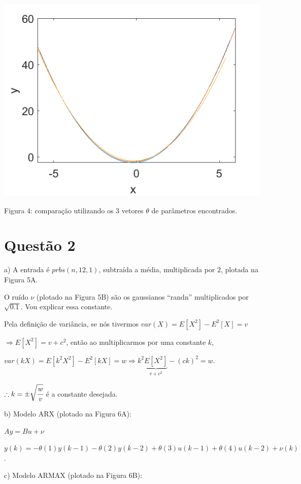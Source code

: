 \documentclass{rbfin}
\begin{document}
\begin{center}
\includegraphics[scale=0.666]{4 regredidos}

Figura 4: comparação utilizando os 3 vetores $\theta$ de parâmetros encontrados.
\end{center}

\section*{Questão 2}

a) A entrada é $prbs(n,12,1)$, subtraída a média, multiplicada por $2$, plotada na Figura 5A.

O ruído $\nu$ (plotado na Figura 5B) são os gaussianos ``randn'' multiplicados por $\sqrt{0.1}$. Vou explicar essa constante.

Pela definição de variância, se nós tivermos $var(X) = E[X^2] - E^2[X] = v$

$\Rightarrow E[X^2] = v + c^2$, então ao multiplicarmos por uma constante $k$, 

$var(kX) = E[k^2 X^2] - E^2[kX] = w \Rightarrow k^2 \underbrace{E[X^2]}_{v + c^2} - (ck)^2 = w$.

$\therefore k = \pm \sqrt{\cfrac{w}{v}}$ é a constante desejada.

b) Modelo ARX (plotado na Figura 6A):

$Ay = Bu + \nu$

$y(k) = - \theta(1) y(k-1) - \theta(2) y(k-2) + \theta(3) u(k - 1) + \theta(4) u(k - 2) + \nu(k)$.

c) Modelo ARMAX (plotado na Figura 6B):
\end{document}
